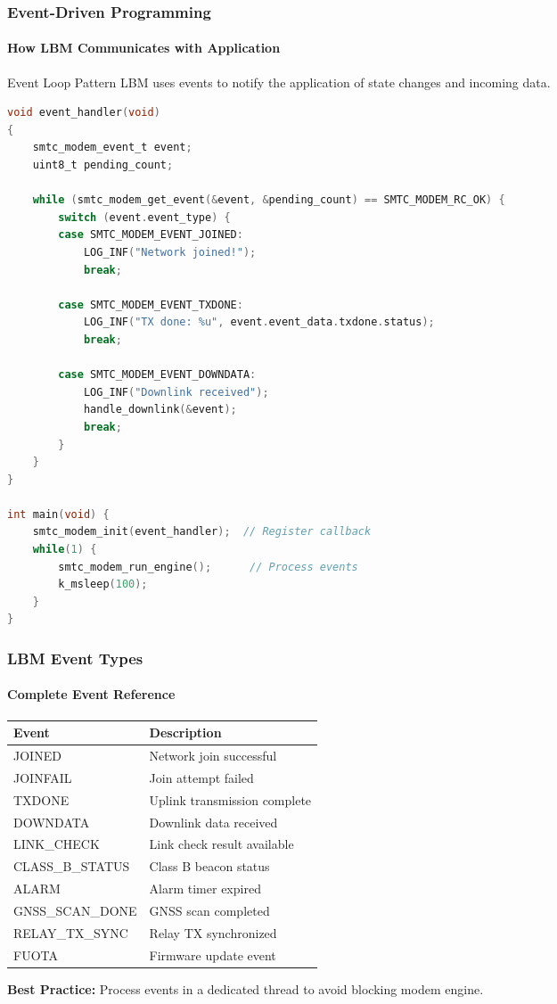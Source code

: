 \documentclass{beamer}
\begin{document}
\begin{frame}[fragile]
\frametitle{Event-Driven Programming}
\framesubtitle{How LBM Communicates with Application}

\begin{block}{Event Loop Pattern}
LBM uses events to notify the application of state changes and incoming data.
\end{block}

\begin{lstlisting}[language=C, basicstyle=\tiny\ttfamily]
void event_handler(void)
{
    smtc_modem_event_t event;
    uint8_t pending_count;

    while (smtc_modem_get_event(&event, &pending_count) == SMTC_MODEM_RC_OK) {
        switch (event.event_type) {
        case SMTC_MODEM_EVENT_JOINED:
            LOG_INF("Network joined!");
            break;

        case SMTC_MODEM_EVENT_TXDONE:
            LOG_INF("TX done: %u", event.event_data.txdone.status);
            break;

        case SMTC_MODEM_EVENT_DOWNDATA:
            LOG_INF("Downlink received");
            handle_downlink(&event);
            break;
        }
    }
}

int main(void) {
    smtc_modem_init(event_handler);  // Register callback
    while(1) {
        smtc_modem_run_engine();      // Process events
        k_msleep(100);
    }
}
\end{lstlisting}
\end{frame}

\begin{frame}
\frametitle{LBM Event Types}
\framesubtitle{Complete Event Reference}

\begin{table}
\tiny
\begin{tabular}{|l|p{6cm}|}
\hline
\textbf{Event} & \textbf{Description} \\
\hline
JOINED & Network join successful \\
JOINFAIL & Join attempt failed \\
TXDONE & Uplink transmission complete \\
DOWNDATA & Downlink data received \\
LINK\_CHECK & Link check result available \\
CLASS\_B\_STATUS & Class B beacon status \\
ALARM & Alarm timer expired \\
GNSS\_SCAN\_DONE & GNSS scan completed \\
RELAY\_TX\_SYNC & Relay TX synchronized \\
FUOTA & Firmware update event \\
\hline
\end{tabular}
\end{table}

\vspace{1em}

\textbf{Best Practice:} Process events in a dedicated thread to avoid blocking modem engine.
\end{frame}
\end{document}
